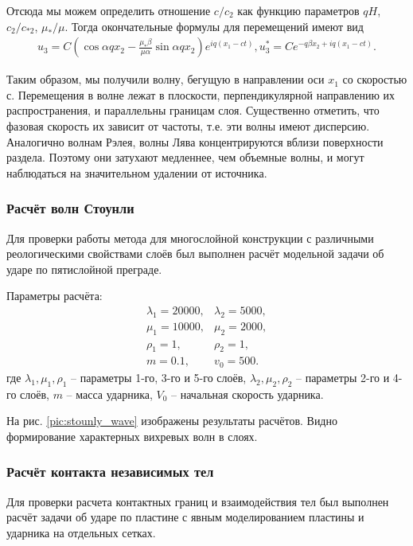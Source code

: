 Отсюда мы можем определить отношение $c/c_2$ как функцию параметров $qH$, $c_2/c_{*2}$, $\mu_*/\mu$.  Тогда окончательные формулы для перемещений имеют вид
\begin{eqnarray}
u_3 = C (\cos{\alpha q x_2} - \frac{\mu_* \beta}{\mu \alpha} \sin{\alpha q x_2}) e^{iq(x_1-ct)},
u_3^* = C e^{-q \beta x_2 + i q (x_1 - ct)}.
\end{eqnarray}

Таким образом, мы получили волну, бегущую в направлении оси $x_1$ со скоростью $с$. Перемещения в волне лежат в плоскости, перпендикулярной направлению их распространения, и параллельны границам слоя. Существенно отметить, что фазовая скорость их зависит от частоты, т.е. эти волны имеют дисперсию. Аналогично волнам Рэлея, волны Лява концентрируются вблизи поверхности раздела. Поэтому они затухают медленнее, чем объемные волны, и могут наблюдаться на значительном удалении от источника.


\clearpage
\newpage

\subsubsection{Расчёт волн Стоунли}

Для проверки работы метода для многослойной конструкции с различными реологическими свойствами слоёв был выполнен расчёт модельной задачи об ударе по пятислойной преграде.

Параметры расчёта:
\begin{eqnarray}
\lambda_1=20000, & \lambda_2=5000, \\
\mu_1=10000, & \mu_2=2000, \\
\rho_1=1, & \rho_2=1, \\
m = 0.1, & v_0 = 500.
\end{eqnarray}
где $\lambda_1, \mu_1, \rho_1$ -- параметры 1-го, 3-го и 5-го слоёв, $\lambda_2, \mu_2, \rho_2$ -- параметры 2-го и 4-го слоёв, $m$ -- масса ударника, $V_0$ -- начальная скорость ударника.

На рис. \ref{pic:stounly_wave} изображены результаты расчётов. Видно формирование характерных вихревых волн в слоях.


\subsubsection{Расчёт контакта независимых тел}

Для проверки расчета контактных границ и взаимодействия тел был выполнен расчёт задачи об ударе по пластине с явным моделированием пластины и ударника на отдельных сетках.


